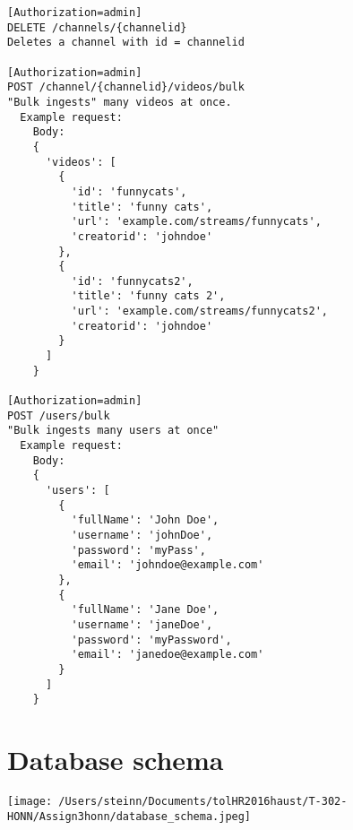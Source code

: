 \documentclass[11pt, a4paper]{article}
\begin{document}
\begin{lstlisting}
[Authorization=admin]
DELETE /channels/{channelid}
Deletes a channel with id = channelid

[Authorization=admin]
POST /channel/{channelid}/videos/bulk
"Bulk ingests" many videos at once.
  Example request:
    Body:
    {
      'videos': [
        {
          'id': 'funnycats',
          'title': 'funny cats',
          'url': 'example.com/streams/funnycats',
          'creatorid': 'johndoe'
        },
        {
          'id': 'funnycats2',
          'title': 'funny cats 2',
          'url': 'example.com/streams/funnycats2',
          'creatorid': 'johndoe'
        }
      ]
    }

[Authorization=admin]
POST /users/bulk
"Bulk ingests many users at once"
  Example request:
    Body:
    {
      'users': [
        {
          'fullName': 'John Doe',
          'username': 'johnDoe',
          'password': 'myPass',
          'email': 'johndoe@example.com'
        },
        {
          'fullName': 'Jane Doe',
          'username': 'janeDoe',
          'password': 'myPassword',
          'email': 'janedoe@example.com'
        }
      ]
    }
		\end{lstlisting}
\newpage
	\section{Database schema}
		\texttt{[image: /Users/steinn/Documents/tolHR2016haust/T-302-HONN/Assign3honn/database\_schema.jpeg]}
\end{document}
